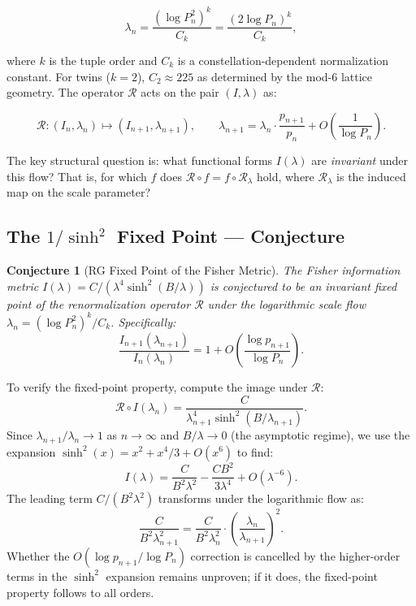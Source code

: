 \documentclass[11pt]{article}
\newtheorem{conjecture}[theorem]{Conjecture}
\theoremstyle{remark}
\begin{document}
\begin{equation}
\lambda_n = \frac{(\log P_n^2)^k}{C_k} = \frac{(2 \log P_n)^k}{C_k},
\label{eq:lambda-flow}
\end{equation}

where $k$ is the tuple order and $C_k$ is a constellation-dependent
normalization constant. For twins ($k=2$), $C_2 \approx 225$ as
determined by the mod-6 lattice geometry. The operator $\mathcal{R}$
acts on the pair $(I, \lambda)$ as:

\begin{equation}
\mathcal{R} : (I_n, \lambda_n) \mapsto (I_{n+1}, \lambda_{n+1}),
\qquad \lambda_{n+1} = \lambda_n \cdot \frac{p_{n+1}}{p_n} + O\left(\frac{1}{\log P_n}\right).
\end{equation}

The key structural question is: what functional forms $I(\lambda)$ are
\emph{invariant} under this flow? That is, for which $f$ does
$\mathcal{R} \circ f = f \circ \mathcal{R}_\lambda$ hold, where
$\mathcal{R}_\lambda$ is the induced map on the scale parameter?

\subsection{The $1/\sinh^2$ Fixed Point — Conjecture}

\begin{conjecture}[RG Fixed Point of the Fisher Metric]
\label{thm:rg-fixed-point}
The Fisher information metric $I(\lambda) = C/(\lambda^4 \sinh^2(B/\lambda))$
is conjectured to be an invariant fixed point of the renormalization
operator $\mathcal{R}$ under the logarithmic scale flow
$\lambda_n = (\log P_n^2)^k / C_k$. Specifically:
\begin{equation}
\frac{I_{n+1}(\lambda_{n+1})}{I_n(\lambda_n)} = 1 + O\!\left(\frac{\log p_{n+1}}{\log P_n}\right).
\end{equation}
\end{conjecture}

To verify the fixed-point property, compute the image under $\mathcal{R}$:
\begin{equation}
\mathcal{R} \circ I(\lambda_n) = \frac{C}{\lambda_{n+1}^4 \sinh^2(B/\lambda_{n+1})}.
\end{equation}
Since $\lambda_{n+1}/\lambda_n \to 1$ as $n \to \infty$
and $B/\lambda \to 0$ (the asymptotic regime), we use the expansion
$\sinh^2(x) = x^2 + x^4/3 + O(x^6)$ to find:
\begin{equation}
I(\lambda) = \frac{C}{B^2 \lambda^2} - \frac{CB^2}{3\lambda^4} + O(\lambda^{-6}).
\end{equation}
The leading term $C/(B^2 \lambda^2)$ transforms under the logarithmic
flow as:
\begin{equation}
\frac{C}{B^2 \lambda_{n+1}^2} = \frac{C}{B^2 \lambda_n^2} \cdot
\left(\frac{\lambda_n}{\lambda_{n+1}}\right)^2.
\end{equation}
Whether the $O(\log p_{n+1}/\log P_n)$ correction is cancelled by the
higher-order terms in the $\sinh^2$ expansion remains unproven; if it
does, the fixed-point property follows to all orders.
\end{document}
